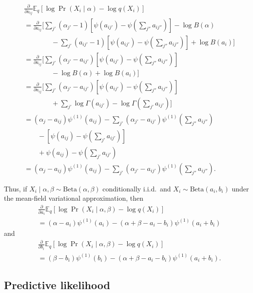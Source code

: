 \documentclass{article}
\newcommand{\Beta}{\ensuremath{\mathrm{Beta}}}
\newcommand{\digamma}[1]{\ensuremath{\psi\left(#1\right)}}
\newcommand{\trigamma}[1]{\ensuremath{\psi^{(1)}\left(#1\right)}}
\newcommand{\Elogdirichlet}[2]{\ensuremath{\digamma{#1} - \digamma{#2}}}
\newcommand{\Eq}{\ensuremath{\mathbb{E}_q\xspace}}
\newcommand{\pd}[1]{\ensuremath{\frac{\partial}{\partial #1}}}
\begin{document}
\begin{align*}
    &\pd{a_{ij}} \Eq \left[ \log \Pr(X_i \mid \alpha) - \log q(X_i) \right] \\
    &= \pd{a_{ij}} \Bigg[
        \sum_{j'} (\alpha_{j'} - 1) \left[ \Elogdirichlet{a_{ij'}}{\sum_{j''}{a_{ij''}}} \right] - \log B(\alpha) \\
        &\qquad\qquad - \sum_{j'} (a_{ij'} - 1) \left[ \Elogdirichlet{a_{ij'}}{\sum_{j''}{a_{ij''}}} \right] + \log B(a_i)
    \Bigg] \\
    &= \pd{a_{ij}} \Bigg[
        \sum_{j'} (\alpha_{j'} - a_{ij'}) \left[ \Elogdirichlet{a_{ij'}}{\sum_{j''}{a_{ij''}}} \right] \\
        &\qquad\qquad - \log B(\alpha) + \log B(a_i)
    \Bigg] \\
    &= \pd{a_{ij}} \Bigg[
        \sum_{j'} (\alpha_{j'} - a_{ij'}) \left[ \Elogdirichlet{a_{ij'}}{\sum_{j''}{a_{ij''}}} \right] \\
        &\qquad\qquad + \sum_{j'} \log \Gamma(a_{ij'}) - \log \Gamma\left( \sum_{j'} a_{ij'} \right)
    \Bigg] \\
    &= (\alpha_{j} - a_{ij}) \trigamma{a_{ij}} - \sum_{j'} (\alpha_{j'} - a_{ij'}) \trigamma{\sum_{j''}{a_{ij''}}} \\
        &\qquad - \left[ \Elogdirichlet{a_{ij}}{\sum_{j'}{a_{ij'}}} \right] \\
        &\qquad + \Elogdirichlet{a_{ij}}{\sum_{j'}{a_{ij'}}} \\
    &= (\alpha_{j} - a_{ij}) \trigamma{a_{ij}} - \sum_{j'} (\alpha_{j'} - a_{ij'}) \trigamma{\sum_{j''}{a_{ij''}}} .
\end{align*}

Thus, if $X_i \mid \alpha, \beta \sim \Beta(\alpha, \beta)$ conditionally i.i.d.\ and $X_i \sim \Beta(a_i, b_i)$ under the mean-field variational approximation, then
\begin{align*}
    &\pd{a_i} \Eq \left[ \log \Pr(X_i \mid \alpha, \beta) - \log q(X_i) \right] \\
    &= (\alpha - a_i) \trigamma{a_i} - (\alpha + \beta - a_i - b_i) \trigamma{a_i + b_i}
\end{align*}
and
\begin{align*}
    &\pd{b_i} \Eq \left[ \log \Pr(X_i \mid \alpha, \beta) - \log q(X_i) \right] \\
    &= (\beta - b_i) \trigamma{b_i} - (\alpha + \beta - a_i - b_i) \trigamma{a_i + b_i} .
\end{align*}

\subsection*{Predictive likelihood}
\end{document}

